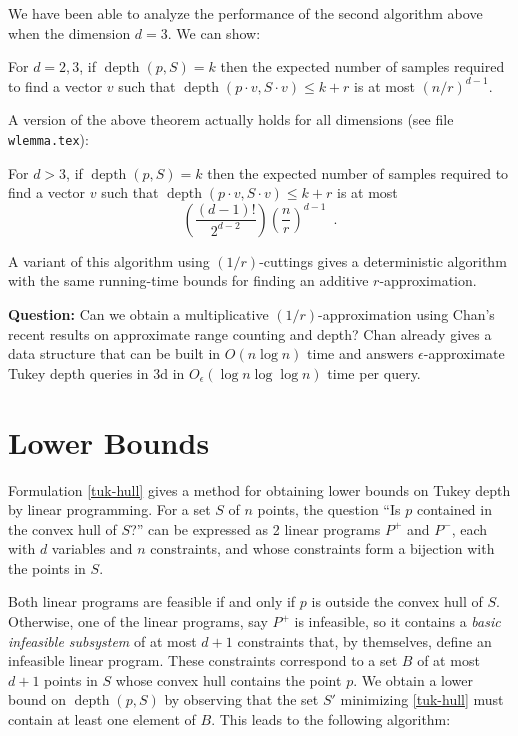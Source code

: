 \documentclass[lotsofwhite,12pt]{patmorin}
\DeclareMathOperator{\td}{depth}
\begin{document}
 We have been able to analyze the
performance of the second algorithm above when the dimension $d=3$. We
can show:
\begin{thm}
For $d=2,3$, if $\td(p,S)=k$ then the expected number of samples required to
find a vector $v$ such that $\td(p\cdot v,S\cdot v) \le k+r$ is at
most $(n/r)^{d-1}$.
\end{thm}
A version of the above theorem actually holds for all dimensions (see
file \texttt{wlemma.tex}):
\begin{thm}
For $d>3$, if $\td(p,S)=k$ then the expected number of samples required to
find a vector $v$ such that $\td(p\cdot v,S\cdot v) \le k+r$ is at
most
\[
   \left(\frac{(d-1)!}{2^{d-2}} \right)\left(\frac{n}{r}\right)^{d-1}
     \enspace .
\]
\end{thm}
A variant of this algorithm using $(1/r)$-cuttings gives a
deterministic algorithm with the same running-time bounds for finding
an additive $r$-approximation.

\noindent\textbf{Question:}
Can we obtain a multiplicative $(1/r)$-approximation using Chan's
recent results on approximate range counting and depth?  Chan already
gives a data structure that can be built in $O(n\log n)$ time and
answers $\epsilon$-approximate Tukey depth queries in 3d in
$O_\epsilon(\log n\log\log n)$ time per query.

\section{Lower Bounds}

Formulation \eqref{tuk-hull} gives a method for obtaining lower bounds
on Tukey depth by linear programming.  For a set $S$ of $n$ points,
the question ``Is $p$ contained in the convex hull of $S$?'' can be
expressed as 2 linear programs $P^+$ and $P^-$, each with $d$
variables and $n$ constraints, and whose constraints form a bijection
with the points in $S$.  

Both linear programs are feasible if and only if $p$ is outside the
convex hull of $S$. Otherwise, one of the linear programs, say $P^+$
is infeasible, so it contains a \emph{basic infeasible subsystem} of
at most $d+1$ constraints that, by themselves, define an infeasible
linear program.  These constraints correspond to a set $B$ of at most
$d+1$ points in $S$ whose convex hull contains the point $p$.  We
obtain a lower bound on $\td(p,S)$ by observing that the set $S'$
minimizing \eqref{tuk-hull} must contain at least one element of $B$.
This leads to the following algorithm:
\end{document}
